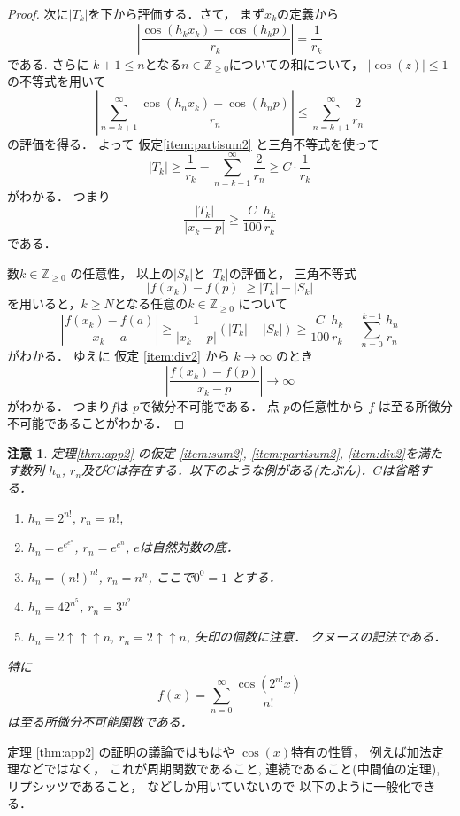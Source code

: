 \documentclass[leqno, a4paper, 12pt]{jsarticle}
\newtheorem*{rmk}{注意}
\newcommand{\zz}{\mathbb{Z}}
\newcommand{\knus}{\mathbin{\uparrow\uparrow}}
\newcommand{\knuss}{\mathbin{\uparrow\uparrow\uparrow}}
\begin{document}
\begin{proof}
次に$|T_{k}|$を下から評価する．さて，
まず$x_{k}$の定義から
\[
\left|\frac{\cos(h_{k}x_{k})-\cos(h_{k}p)}{r_{k}}\right|
=\frac{1}{r_{k}}
\]
である.
さらに
$k+1\le n$となる$n\in \zz_{\ge 0}$についての和について，
$|\cos(z)|\le 1$の不等式を用いて
\[
\left|\sum_{n=k+1}^{\infty}\frac{\cos(h_{n}x_{k})-\cos(h_{n}p)}{r_{n}}\right|
\le 
\sum_{n=k+1}^{\infty}\frac{2}{r_{n}}
\]
の評価を得る．
よって
仮定\ref{item:partisum2}
と三角不等式を使って
\[
|T_{k}|
\ge \frac{1}{r_{k}}-\sum_{n=k+1}^{\infty}\frac{2}{r_{n}}
\ge C\cdot \frac{1}{r_{k}}
\]
がわかる．
つまり
\[
\frac{|T_{k}|}{|x_{k}-p|}
\ge \frac{C}{100}\frac{h_{k}}{r_{k}}
\]
である．

数$k\in \zz_{\ge 0}$
の任意性，
以上の$|S_{k}|$と
$|T_{k}|$の評価と，
三角不等式
\[
|f(x_{k})-f(p)|\ge |T_{k}|-|S_{k}|
\]
を用いると，$k\ge N$となる任意の$k\in \zz_{\ge 0}$
について
\[
\left|\frac{f(x_{k})-f(a)}{x_{k}-a}\right|\ge
\frac{1}{|x_{k}-p|}(|T_{k}|-|S_{k}|)
\ge  
\frac{C}{100}
\frac{h_{k}}{r_{k}}
-
\sum_{n=0}^{k-1}\frac{h_{n}}{r_{n}}
\]
がわかる．
ゆえに
仮定
\ref{item:div2}
から
$k\to \infty$
のとき
\[
\left|\frac{f(x_{k})-f(p)}{x_{k}-p}\right|\to \infty
\]
がわかる．
つまり$f$は
$p$で微分不可能である．
点
$p$の任意性から
$f$
は至る所微分不可能であることがわかる．
\end{proof}
\begin{rmk}
定理\ref{thm:app2}
の仮定
\ref{item:sum2}, 
\ref{item:partisum2}, 
\ref{item:div2}を満たす数列
$h_{n}$, $r_{n}$及び$C$は存在する．以下のような例がある(たぶん)．$C$は省略する．
\begin{enumerate}[label=\textup{(\arabic*)}]
\item 
$h_{n}=2^{n!}$, 
$r_{n}=n!$, 
\item 
$h_{n}=e^{e^{e^{n}}}$, 
$r_{n}=e^{e^{n}}$, 
$e$は自然対数の底．

\item 
$h_{n}=(n!)^{n!}$, 
$r_{n}=n^{n}$, 
ここで$0^{0}=1$
とする．
\item 
$h_{n}=42^{n^{5}}$, 
$r_{n}=3^{n^{2}}$

\item 
$h_{n}=2\knuss n$, 
$r_{n}=2\knus n$, 
矢印の個数に注意．
クヌースの記法である．

\end{enumerate}
特に
\[
f(x)=\sum_{n=0}^{\infty}\frac{\cos\left(2^{n!}x\right)}{n!}
\]
は至る所微分不可能関数である．
\end{rmk}


定理
\ref{thm:app2}
の証明の議論ではもはや
$\cos(x)$特有の性質，
例えば加法定理などではなく，
これが周期関数であること, 
連続であること(中間値の定理), 
リプシッツであること，
などしか用いていないので
以下のように一般化できる．
\end{document}
